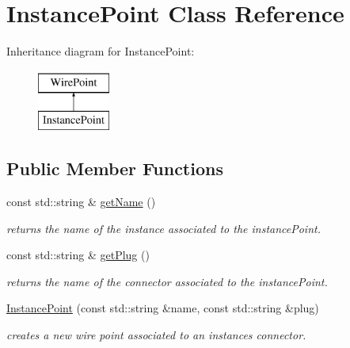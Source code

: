 \hypertarget{class_open_chams_1_1_instance_point}{}\section{Instance\+Point Class Reference}
\label{class_open_chams_1_1_instance_point}
Inheritance diagram for Instance\+Point\+:\begin{figure}[H]
\begin{center}
\leavevmode
\includegraphics[height=2.000000cm]{class_open_chams_1_1_instance_point}
\end{center}
\end{figure}
\subsection*{Public Member Functions}
\begin{DoxyCompactItemize}
\item 
\mbox{\label{class_open_chams_1_1_instance_point_a2858c0c4e8b5108f041237cf5a802029}} 
const std\+::string \& \hyperlink{class_open_chams_1_1_instance_point_a2858c0c4e8b5108f041237cf5a802029}{get\+Name} ()
\begin{DoxyCompactList}\small\item\em returns the name of the instance associated to the instance\+Point. \end{DoxyCompactList}\item 
\mbox{\label{class_open_chams_1_1_instance_point_a646d464666fc56ab2e04a6b87fdd3279}} 
const std\+::string \& \hyperlink{class_open_chams_1_1_instance_point_a646d464666fc56ab2e04a6b87fdd3279}{get\+Plug} ()
\begin{DoxyCompactList}\small\item\em returns the name of the connector associated to the instance\+Point. \end{DoxyCompactList}\item 
\hyperlink{class_open_chams_1_1_instance_point_a1f3b6eda5ef7bb872c96f006021a61f1}{Instance\+Point} (const std\+::string \&name, const std\+::string \&plug)
\begin{DoxyCompactList}\small\item\em creates a new wire point associated to an instance\textquotesingle{}s connector. \end{DoxyCompactList}\end{DoxyCompactItemize}


